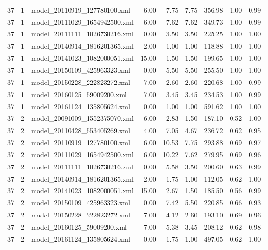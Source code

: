 \begin{table}[ht]
\begin{tabular}{rrlrrrrrr}
   37 &   1 & model\_20110919\_127780100.xml & 6.00 & 7.75 & 7.75 & 356.98 & 1.00 & 0.99 \\ 
   37 &   1 & model\_20111029\_1654942500.xml & 6.00 & 7.62 & 7.62 & 349.73 & 1.00 & 0.99 \\ 
   37 &   1 & model\_20111111\_1026730216.xml & 0.00 & 3.50 & 3.50 & 225.25 & 1.00 & 1.00 \\ 
   37 &   1 & model\_20140914\_1816201365.xml & 2.00 & 1.00 & 1.00 & 118.88 & 1.00 & 1.00 \\ 
   37 &   1 & model\_20141023\_1082000051.xml & 15.00 & 1.50 & 1.50 & 199.65 & 1.00 & 1.00 \\ 
   37 &   1 & model\_20150109\_425963323.xml & 0.00 & 5.50 & 5.50 & 255.50 & 1.00 & 1.00 \\ 
   37 &   1 & model\_20150228\_222823272.xml & 7.00 & 2.60 & 2.60 & 220.68 & 1.00 & 0.99 \\ 
   37 &   1 & model\_20160125\_59009200.xml & 7.00 & 3.45 & 3.45 & 234.53 & 1.00 & 0.99 \\ 
   37 &   1 & model\_20161124\_135805624.xml & 0.00 & 1.00 & 1.00 & 591.62 & 1.00 & 1.00 \\ 
   37 &   2 & model\_20091009\_1552375070.xml & 6.00 & 2.83 & 1.50 & 187.10 & 0.52 & 1.00 \\ 
   37 &   2 & model\_20110428\_553405269.xml & 4.00 & 7.05 & 4.67 & 236.72 & 0.62 & 0.95 \\ 
   37 &   2 & model\_20110919\_127780100.xml & 6.00 & 10.53 & 7.75 & 293.88 & 0.69 & 0.97 \\ 
   37 &   2 & model\_20111029\_1654942500.xml & 6.00 & 10.22 & 7.62 & 279.95 & 0.69 & 0.96 \\ 
   37 &   2 & model\_20111111\_1026730216.xml & 0.00 & 5.58 & 3.50 & 200.60 & 0.63 & 0.99 \\ 
   37 &   2 & model\_20140914\_1816201365.xml & 2.00 & 1.75 & 1.00 & 112.05 & 0.62 & 1.00 \\ 
   37 &   2 & model\_20141023\_1082000051.xml & 15.00 & 2.67 & 1.50 & 185.50 & 0.56 & 0.99 \\ 
   37 &   2 & model\_20150109\_425963323.xml & 0.00 & 7.42 & 5.50 & 220.85 & 0.66 & 0.93 \\ 
   37 &   2 & model\_20150228\_222823272.xml & 7.00 & 4.12 & 2.60 & 193.10 & 0.69 & 0.96 \\ 
   37 &   2 & model\_20160125\_59009200.xml & 7.00 & 5.38 & 3.45 & 208.12 & 0.62 & 0.98 \\ 
   37 &   2 & model\_20161124\_135805624.xml & 0.00 & 1.75 & 1.00 & 497.05 & 0.62 & 1.00 \\ 

\end{tabular}
\end{table}

